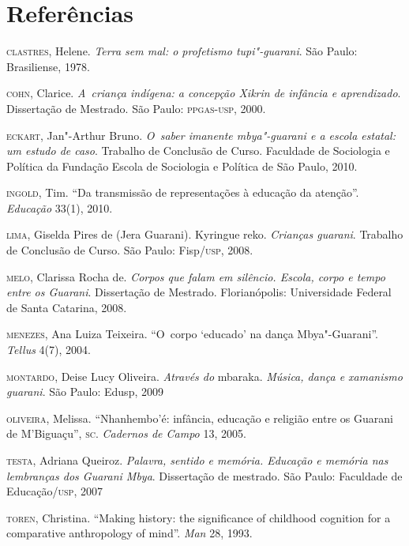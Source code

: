 \section{Referências}

\begin{samepage}
\begin{Parskip}
\textsc{clastres}, Helene. \emph{Terra sem mal: o profetismo tupi"-guarani}. São
Paulo: Brasiliense, 1978.

\textsc{cohn}, Clarice. \emph{A~criança indígena: a concepção Xikrin de infância
e aprendizado}. Dissertação de Mestrado. São Paulo: \textsc{ppgas}-\textsc{usp}, 2000.

\textsc{eckart}, Jan"-Arthur Bruno. \emph{O~saber imanente mbya"-guarani e a escola
estatal: um estudo de caso}. Trabalho de Conclusão de Curso. Faculdade
de Sociologia e Política da Fundação Escola de Sociologia e Política de
São Paulo, 2010.

\textsc{ingold}, Tim. ``Da transmissão de representações à educação da
atenção''. \emph{Educação} 33(1), 2010.

\textsc{lima}, Giselda Pires de (Jera Guarani). Kyringue reko. \emph{Crianças
guarani}. Trabalho de Conclusão de Curso. São Paulo: Fisp/\textsc{usp}, 2008.

\textsc{melo}, Clarissa Rocha de. \emph{Corpos que falam em silêncio. Escola,
corpo e tempo entre os Guarani}. Dissertação de Mestrado.
Florianópolis: Universidade Federal de Santa Catarina, 2008.

\textsc{menezes}, Ana Luiza Teixeira. ``O~corpo `educado' na dança
Mbya"-Guarani''. \emph{Tellus} 4(7), 2004.

\textsc{montardo}, Deise Lucy Oliveira. \emph{Através do} mbaraka. \emph{Música, dança e
xamanismo guarani}. São Paulo: Edusp, 2009

\textsc{oliveira}, Melissa. ``Nhanhembo’é: infância, educação e religião
entre os Guarani de M’Biguaçu'', \textsc{sc}. \emph{Cadernos de Campo} 13, 2005.

\textsc{testa}, Adriana Queiroz. \emph{Palavra, sentido e memória. Educação e
memória nas lembranças dos Guarani Mbya}. Dissertação de mestrado. São
Paulo: Faculdade de Educação/\textsc{usp}, 2007

\textsc{toren}, Christina. ``Making history: the significance of childhood
cognition for a comparative anthropology of mind''. \emph{Man} 28, 1993.
\end{Parskip}
\end{samepage}


